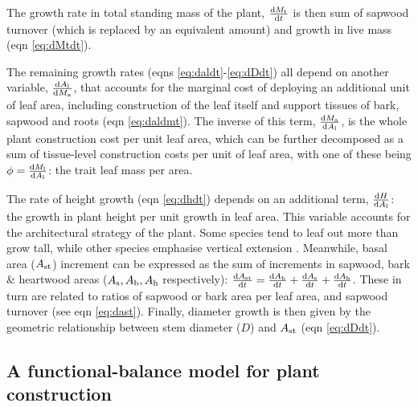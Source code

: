 \documentclass[a4paper,11pt]{article}
\begin{document}
The growth rate in total standing mass of the plant, $\frac{{\rm d}M_{{\rm t}}}{{\rm d}t}$ is then sum of sapwood turnover (which is replaced by an equivalent amount) and growth in live mass (eqn \ref{eq:dMtdt}).

The remaining growth rates (eqns \ref{eq:daldt}-\ref{eq:dDdt}) all depend on another variable, $\frac{{\rm d}A_{\rm l}} {{\rm d}M_{\rm a}}$, that accounts for the marginal cost of deploying an additional unit of leaf area, including construction of the leaf itself and support tissues of bark, sapwood and roots (eqn \ref{eq:daldmt}). The inverse of this term, $\frac{{\rm d}M_{\rm a} }{{\rm d}A_{\rm l}}$, is the whole plant construction cost per unit leaf area, which can be further decomposed as a sum of tissue-level construction costs per unit of leaf area, with one of these being $\phi = \frac{{\rm d}M_{\rm l} }{{\rm d}A_{\rm l}}$: the trait leaf mass per area.

The rate of height growth (eqn \ref{eq:dhdt}) depends on an additional term, $\frac{{\rm d}H }{{\rm d}A_{\rm l}}$: the growth in plant height per unit growth in leaf area. This variable accounts for the architectural strategy of the plant. Some species tend to leaf out more than grow tall, while other species emphasise vertical extension \citep{Poorter-2006}. Meanwhile, basal area ($A_{\rm st}$) increment can be expressed as the sum of increments in sapwood, bark \& heartwood areas ($A_{\rm s}, A_{\rm b}, A_{\rm h}$ respectively): $\frac{{\rm d}A_{\rm st}}{{\rm d}t}= \frac{{\rm d}A_{\rm b}}{{\rm d}t} + \frac{{\rm d}A_{\rm s}}{{\rm d}t} + \frac{{\rm d}A_{\rm h}}{{\rm d}t}$. These in turn are related to ratios of sapwood or bark area per leaf area, and sapwood turnover (see eqn \ref{eq:dast}). Finally, diameter growth is then given by the geometric relationship between stem diameter ($D$) and $A_{\rm st}$ (eqn \ref{eq:dDdt}).

\subsection{A functional-balance model for plant construction}
\end{document}
